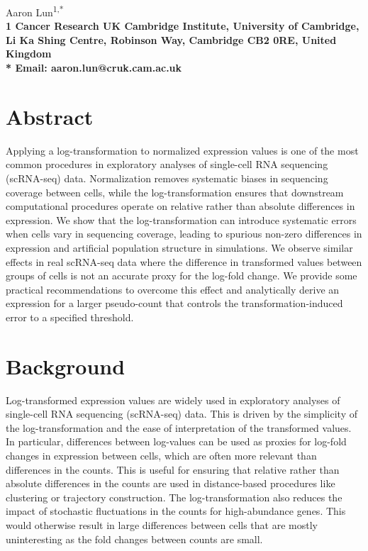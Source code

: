 \documentclass[10pt,letterpaper]{article}
\begin{document}
\vspace*{0.35in}

\begin{flushleft}
{\Large
    \textbf{}
}
\newline

Aaron Lun\textsuperscript{1,*}
\\
\bigskip
\bf{1} Cancer Research UK Cambridge Institute, University of Cambridge, Li Ka Shing Centre, Robinson Way, Cambridge CB2 0RE, United Kingdom \\
\bigskip
* Email: aaron.lun@cruk.cam.ac.uk
\end{flushleft}

\section*{Abstract}
Applying a log-transformation to normalized expression values is one of the most common procedures in exploratory analyses of single-cell RNA sequencing (scRNA-seq) data.
Normalization removes systematic biases in sequencing coverage between cells, while the log-transformation ensures that downstream computational procedures operate on relative rather than absolute differences in expression.
We show that the log-transformation can introduce systematic errors when cells vary in sequencing coverage,
leading to spurious non-zero differences in expression and artificial population structure in simulations.
We observe similar effects in real scRNA-seq data where the difference in transformed values between groups of cells is not an accurate proxy for the log-fold change.
We provide some practical recommendations to overcome this effect and analytically derive an expression for a larger pseudo-count that controls the transformation-induced error to a specified threshold.

\section{Background}
Log-transformed expression values are widely used in exploratory analyses of single-cell RNA sequencing (scRNA-seq) data.
This is driven by the simplicity of the log-transformation and the ease of interpretation of the transformed values.
In particular, differences between log-values can be used as proxies for log-fold changes in expression between cells, which are often more relevant than differences in the counts.
This is useful for ensuring that relative rather than absolute differences in the counts are used in distance-based procedures like clustering or trajectory construction.
The log-transformation also reduces the impact of stochastic fluctuations in the counts for high-abundance genes.
This would otherwise result in large differences between cells that are mostly uninteresting as the fold changes between counts are small.
\end{document}
